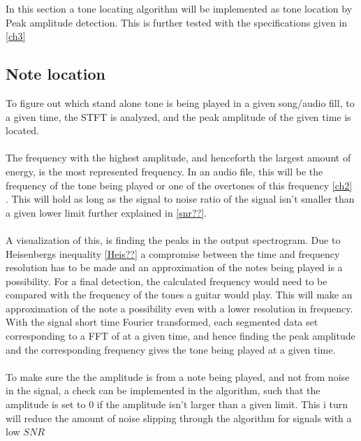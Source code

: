\label{sec:peak_detection}
In this section a tone locating algorithm will be implemented as tone location by Peak amplitude detection.
This is further tested with the specifications given in \ref{ch3}
\subsection{Note location}
To figure out which stand alone tone is being played in a given song/audio fill, to a given time, the STFT is analyzed, and the peak amplitude of the given time is located.\\
\\
The frequency with the highest amplitude, and henceforth the largest amount of energy, is the most represented frequency. 
In an audio file, this will be the frequency of the tone being played or one of the overtones of this frequency \ref{ch2} .
This will hold as long as the signal to noise ratio of the signal isn't smaller than a given lower limit further explained in \ref{snr??}. 
\\
\\
A visualization of this, is finding the peaks in the output spectrogram.
Due to Heisenbergs inequality \ref{Heis??}  a compromise between the time and frequency resolution has to be made and an approximation of the notes being played is a possibility.
For a final detection, the calculated frequency would need to be compared with the frequency of the tones a guitar would play. 
This will make an approximation of the note a possibility even with a lower resolution in frequency.
\\
With the signal short time Fourier transformed, each segmented data set corresponding to a FFT of at a given time, and hence finding the peak amplitude and the corresponding frequency gives the tone being played at a given time.
\\\\
To make sure the the amplitude is from a note being played, and not from noise in the signal, a check can be implemented in the algorithm, such that the amplitude is set to $0$ if the amplitude isn't larger than a given limit.
This i turn will reduce the amount of noise slipping through the algorithm for signals with a low $SNR$

